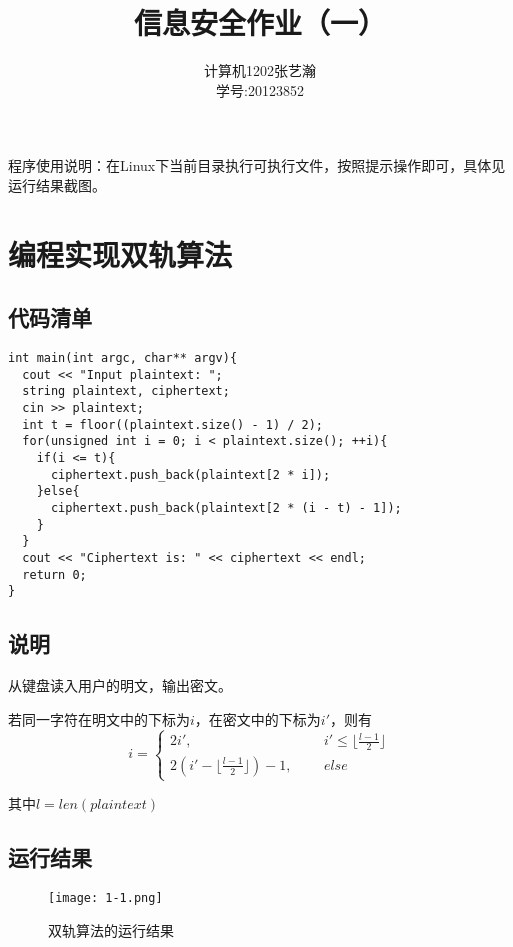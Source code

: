 \documentclass[11pt]{article}
\begin{document}
\title{信息安全作业（一）}
\author{计算机1202\quad 张艺瀚\\学号:20123852}
\maketitle

\thispagestyle{fancy}
\normalsize

程序使用说明：在Linux下当前目录执行可执行文件，按照提示操作即可，具体见运行结果截图。

\section{编程实现双轨算法}
\subsection{代码清单}
\begin{center}
\begin{lstlisting}[caption = {双轨算法的C++实现}, label = {lst: code1}]
int main(int argc, char** argv){
  cout << "Input plaintext: ";
  string plaintext, ciphertext;
  cin >> plaintext;
  int t = floor((plaintext.size() - 1) / 2);
  for(unsigned int i = 0; i < plaintext.size(); ++i){
    if(i <= t){
      ciphertext.push_back(plaintext[2 * i]);
    }else{
      ciphertext.push_back(plaintext[2 * (i - t) - 1]);
    }
  }
  cout << "Ciphertext is: " << ciphertext << endl;
  return 0;
}
\end{lstlisting}
\end{center}

\subsection{说明}
从键盘读入用户的明文，输出密文。

若同一字符在明文中的下标为$i$，在密文中的下标为$i'$，则有
\[ 
i= 
\begin{cases}
2i',\quad \ \ & i' \leq \lfloor \frac{l - 1}{2} \rfloor\\ 
2\left( i'- \lfloor \frac{l - 1}{2} \rfloor\right) - 1, \quad \ \ & else 
\end{cases} 
\]

其中$l = len(plaintext)$

\subsection{运行结果}
\begin{center}
\begin{figure}[htbp]
\texttt{[image: 1-1.png]}
\caption{双轨算法的运行结果}
\label{fig: rlt1}
\end{figure}
\end{center}
\end{document}
